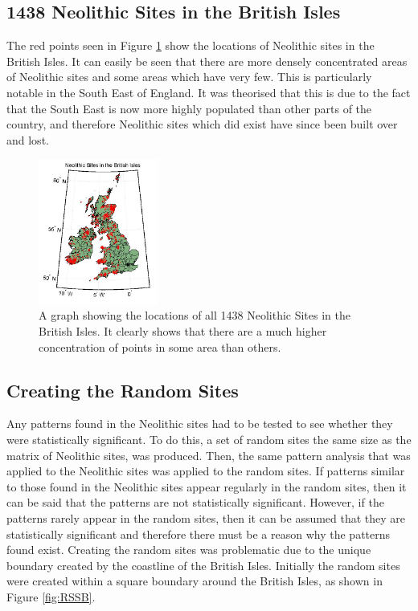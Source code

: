 \documentclass[a4paper]{article}
\begin{document}
\subsection{1438 Neolithic Sites in the British Isles}
The red points seen in Figure \ref{fig:NSBI} show the locations of Neolithic sites in the British Isles. It can easily be seen that there are more densely concentrated areas of Neolithic sites and some areas which have very few. This is particularly notable in the South East of England. It was theorised that this is due to the fact that the South East is now more highly populated than other parts of the country, and therefore Neolithic sites which did exist have since been built over and lost. 

\begin{figure}[H]
\centering
\includegraphics[width=0.35\textwidth]{NSBI.png}
\caption{\label{fig:NSBI}A graph showing the locations of all 1438 Neolithic Sites in the British Isles. It clearly shows that there are a much higher concentration of points in some area than others.}
\end{figure}

\subsection{Creating the Random Sites}
Any patterns found in the Neolithic sites had to be tested to see whether they were statistically significant. To do this, a set of random sites the same size as the matrix of Neolithic sites, was produced. Then, the same pattern analysis that was applied to the Neolithic sites was applied to the random sites. If patterns similar to those found in the Neolithic sites appear regularly in the random sites, then it can be said that the patterns are not statistically significant. However, if the patterns rarely appear in the random sites, then it can be assumed that they are statistically significant and therefore there must be a reason why the patterns found exist. 
\newline \newline
Creating the random sites was problematic due to the unique boundary created by the coastline of the British Isles. Initially the random sites were created within a square boundary around the British Isles, as shown in Figure \ref{fig:RSSB}. 
\end{document}
